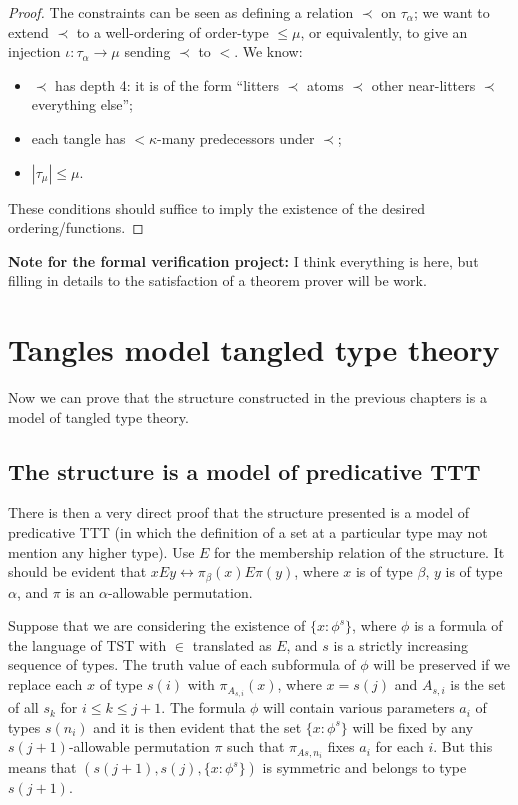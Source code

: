 \begin{proof}
  The constraints can be seen as defining a relation $\prec$ on $\tau_\alpha$; we want to extend $\prec$ to a well-ordering of order-type $\leq \mu$, or equivalently, to give an injection $\iota:\tau_\alpha \to \mu$ sending $\prec$ to $<$.  We know:
  \begin{itemize}
  \item $\prec$ has depth 4: it is of the form “litters $\prec$ atoms $\prec$ other near-litters $\prec$ everything else”;
  \item each tangle has $<\kappa$-many predecessors under $\prec$;
  \item $|\tau_\mu| \leq \mu$.
  \end{itemize}
  These conditions should suffice to imply the existence of the desired ordering/functions.
\end{proof}

{\bf Note for the formal verification project:}  I think everything is here, but filling in details to the satisfaction of a theorem prover will be work.
\newpage

\chapter{Tangles model tangled type theory}

Now we can prove that the structure constructed in the previous chapters is a model of tangled type theory.

\section{The structure is a model of predicative TTT}

There is then a very direct proof that the structure presented is a model of predicative TTT (in which the definition of a set at a particular type may not mention any higher type).  Use $E$ for the membership relation of the structure.  It should be evident that $x E y \leftrightarrow \pi_\beta(x) E \pi(y)$,
where $x$ is of type $\beta$, $y$ is of type $\alpha$, and $\pi$ is an $\alpha$-allowable permutation.

Suppose that we are considering the existence of $\{x : \phi^s\}$, where $\phi$ is a formula of the language of TST with $\in$ translated as $E$, and $s$ is a strictly increasing sequence of types.  The truth value of each subformula of $\phi$ will be preserved if we replace each $x$ of type $s(i)$ with $\pi_{A_{s,i}}(x)$, where
$x=s(j)$ and $A_{s,i}$ is the set of all $s_k$ for $i \leq k \leq j+1$.  The formula $\phi$ will contain various parameters $a_i$ of types $s(n_i)$ and it is then evident that the set $\{x : \phi^s\}$ will be fixed by any $s(j+1)$-allowable permutation $\pi$ such that $\pi_{A{s,n_i}}$ fixes $a_i$ for each $i$.  But this means that
$(s(j+1),s(j),\{x : \phi^s\})$ is symmetric and belongs to type $s(j+1)$.

